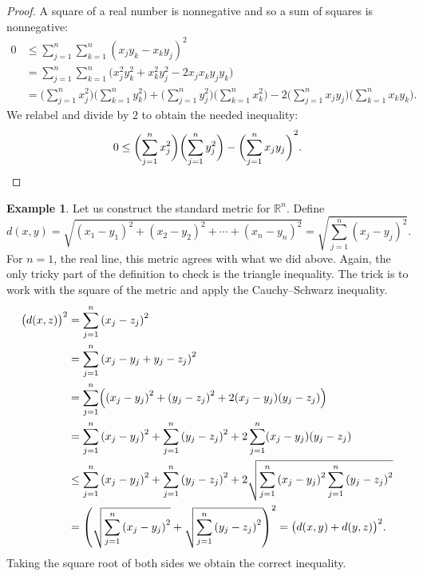 \documentclass[12pt,openany]{book}
\newcommand{\R}{{\mathbb{R}}}
\theoremstyle{plain}
\theoremstyle{remark}
\theoremstyle{definition}
\theoremstyle{exercise}
\theoremstyle{example}
\newtheorem{example}[thm]{Example}
\begin{document}
\begin{proof}
A square of a real number is nonnegative and so a sum of squares is
nonnegative:
\begin{equation*}
\begin{split}
0 & \leq 
\sum_{j=1}^n \sum_{k=1}^n {(x_j y_k - x_k y_j)}^2
\\
& =
\sum_{j=1}^n \sum_{k=1}^n \bigl( x_j^2 y_k^2 + x_k^2 y_j^2 - 2 x_j x_k y_j
y_k \bigr)
\\
& =
\biggl( \sum_{j=1}^n x_j^2 \biggr)
\biggl( \sum_{k=1}^n y_k^2 \biggr)
+
\biggl( \sum_{j=1}^n y_j^2 \biggr)
\biggl( \sum_{k=1}^n x_k^2 \biggr)
-
2
\biggl( \sum_{j=1}^n x_j y_j \biggr)
\biggl( \sum_{k=1}^n x_k y_k \biggr) .
\end{split}
\end{equation*}
We relabel and divide by $2$ to obtain the needed inequality:
\begin{equation*}
0 \leq 
\biggl( \sum_{j=1}^n x_j^2 \biggr)
\biggl( \sum_{j=1}^n y_j^2 \biggr)
-
{\biggl( \sum_{j=1}^n x_j y_j \biggr)}^2 . \qedhere
\end{equation*}
\end{proof}

\begin{example}
Let us construct the
standard metric\index{standard metric on $\R^n$} for $\R^n$.  Define
\begin{equation*}
d(x,y) =
\sqrt{
{(x_1-y_1)}^2 + 
{(x_2-y_2)}^2 + 
\cdots +
{(x_n-y_n)}^2
} =
\sqrt{
\sum_{j=1}^n
{(x_j-y_j)}^2 
} .
\end{equation*}
For $n=1$, the real line, this metric agrees with what we did above.  Again,
the only tricky part of the definition to check is the triangle inequality.
The trick is to work with 
the square of the metric and apply
the Cauchy--Schwarz inequality.
\begin{equation*}
\begin{split}
{\bigl(d(x,z)\bigr)}^2 & =
\sum_{j=1}^n
{(x_j-z_j)}^2 
\\
& =
\sum_{j=1}^n
{(x_j-y_j+y_j-z_j)}^2 
\\
& =
\sum_{j=1}^n
\Bigl(
{(x_j-y_j)}^2+{(y_j-z_j)}^2 + 2(x_j-y_j)(y_j-z_j)
\Bigr)
\\
& =
\sum_{j=1}^n
{(x_j-y_j)}^2
+
\sum_{j=1}^n
{(y_j-z_j)}^2 
+
2
\sum_{j=1}^n
(x_j-y_j)(y_j-z_j)
\\
& \leq
\sum_{j=1}^n
{(x_j-y_j)}^2
+
\sum_{j=1}^n
{(y_j-z_j)}^2 
+
2
\sqrt{
\sum_{j=1}^n
{(x_j-y_j)}^2
\sum_{j=1}^n
{(y_j-z_j)}^2
}
\\
& =
{\left(
\sqrt{
\sum_{j=1}^n
{(x_j-y_j)}^2
}
+
\sqrt{
\sum_{j=1}^n
{(y_j-z_j)}^2 
}
\right)}^2
=
{\bigl( d(x,y) + d(y,z) \bigr)}^2 .
\end{split}
\end{equation*}
Taking the square root of both sides we obtain the correct inequality.
\end{example}
\end{document}
